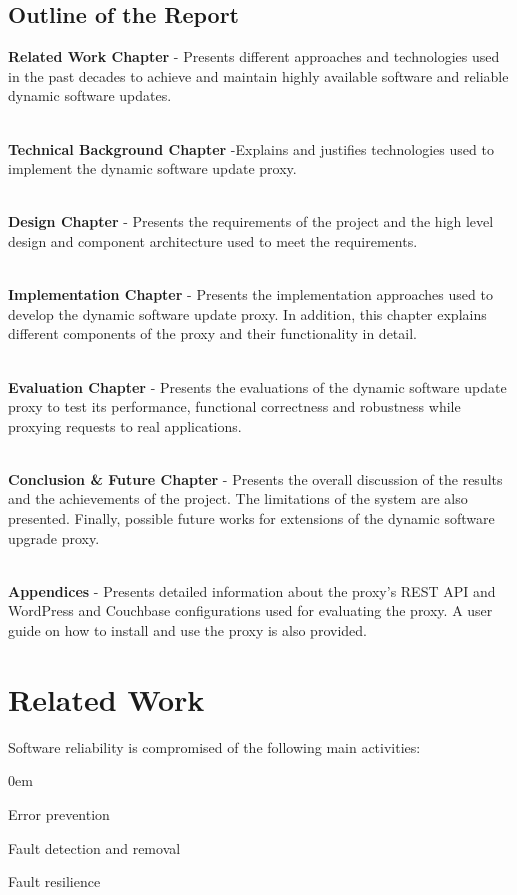 \documentclass[a4paper,11pt,twoside]{report}
\begin{document}
\section{Outline of the Report}
\textbf{Related Work Chapter} - Presents different approaches and technologies used in the past decades to achieve and maintain highly available software and reliable dynamic software updates. 

\noindent \\
\textbf{Technical Background Chapter} -Explains and justifies technologies used to implement the dynamic software update proxy.

\noindent \\
\textbf{ Design Chapter} - Presents the requirements of the project and the high level design and component architecture used to meet the requirements.

\noindent \\
\textbf{Implementation Chapter} - Presents the implementation approaches used to develop the dynamic software update proxy. In addition, this chapter explains different components of the proxy and their functionality in detail. 

\noindent \\
\textbf{Evaluation Chapter} - Presents the evaluations of the dynamic software update proxy to test its performance, functional correctness and robustness while proxying requests to real applications. 

\noindent \\
\textbf{Conclusion \& Future Chapter} - Presents the overall discussion of the results and the achievements of the project. The limitations of the system are also presented. Finally, possible future works for extensions of the dynamic software upgrade proxy. 

\noindent \\
\textbf{Appendices} - Presents detailed information about the proxy's REST API and WordPress and Couchbase configurations used for evaluating the proxy. A user guide on how to install and use the proxy is also provided.   



\clearpage
\chapter{Related Work}
Software reliability is compromised of the following main activities:

  \begin{list}{-}{}
  \itemsep0em
  \item Error prevention 
  
  \item Fault detection and removal
  
  \item Fault resilience
  \end{list}
\end{document}
